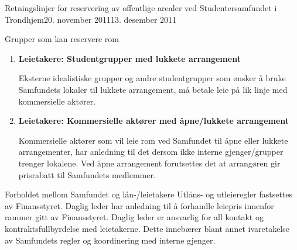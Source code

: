 \documentclass[fsbok.tex]{subfiles}
\begin{document}
\begin{instruks}{Retningslinjer for reservering av offentlige arealer
    ved Studentersamfundet i Trondhjem}{20. november 2011}{13. desember 2011}
\begin{instruksledd}{Grupper som kan reservere rom}
\begin{enumerate}
                Eksterne idealistiske studentgrupper som ønsker å legge sine arrangementer
                til Samfundet
                slipper å betale for romreservasjon under forutsetning av at
                arrangementene er åpne for alle
                Samfundets medlemmer og at arrangør ikke har økonomisk inntjening på
                arrangementet.
                Med ”eksterne idealistiske grupper” forstås i denne instruksen
                studenter/grupper av studenter
                som ikke er tilknyttet gjengene på Samfundet, og som ønsker å legge
                arrangementer av
                kulturell, politisk eller faglig art til Samfundet. Låntakeren skal
                fortrinnsvis være medlem av
                Samfundet, arrangementene skal være åpne for alle våre medlemmer og
                medlemmer skal ha
                rabatt ved eventuell inngangsbillett. Linjeforeningsfester og andre
                lukkede arrangement faller
                inn under utleie (se punkt 3.3 og 3.4).

            \item \textbf{Leietakere: Studentgrupper med lukkete arrangement}

                Eksterne idealistiske grupper og andre studentgrupper som ønsker å bruke
                Samfundets lokaler
                til lukkete arrangement, må betale leie på lik linje med kommersielle
                aktører.

            \item \textbf{ Leietakere: Kommersielle aktører med åpne/lukkete arrangement}

                Kommersielle aktører som vil leie rom ved Samfundet til åpne eller lukkete
                arrangementer,
                har anledning til det dersom ikke interne gjenger/grupper trenger
                lokalene. Ved åpne
                arrangement forutsettes det at arrangøren gir prisrabatt til Samfundets
                medlemmer.
        \end{enumerate}
    \end{instruksledd}

    \begin{instruksledd}{Forholdet mellom Samfundet og lån-/leietakere}
        Utlåns- og utleieregler fastsettes av Finansstyret. Daglig leder har anledning
        til å forhandle
        leiepris innenfor rammer gitt av Finansstyret.
        Daglig leder er ansvarlig for all kontakt og kontraktsfullbyrdelse med
        leietakerne. Dette innebærer blant annet
        ivaretakelse av Samfundets regler og koordinering med interne gjenger.


\end{instruksledd}
\end{instruks}
\end{document}
